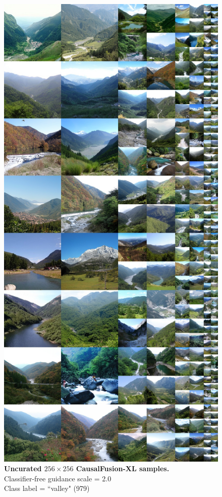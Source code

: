 \begin{figure}\centering
\includegraphics[width=\linewidth]{figs/xl256_979_cfg2.0.jpg}
\caption{\textbf{Uncurated $256\times256$ CausalFusion-XL samples.} \\Classifier-free guidance scale = 2.0\\Class label = ``valley" (979)}\vspace{-2mm}
\label{fig:samples256_4}
\end{figure}


